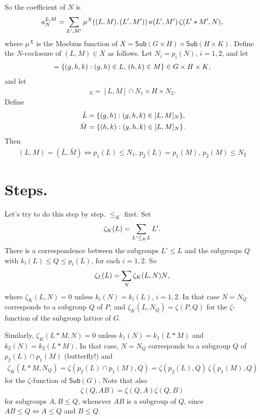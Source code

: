 \documentclass[12pt,a4paper]{amsart}
\newcommand{\Sub}{\mathsf{Sub}}
\begin{document}
So the coefficient of $N$ is
\begin{align*}
  a^{L,M}_N = \sum_{L',M'} \mu^X((L, M), (L', M'))\,  \kappa(L', M') \, \zeta(L' * M', N)\text,
\end{align*}
where $\mu^X$ is the Moebius function of $X = \Sub(G \times H) \times \Sub(H \times K)$.  Define the $N$-coclosure of $(L, M) \in X$ as follows.
Let $N_i = p_i(N)$, $i = 1,2$, and let
\begin{align*}
  [L, M] = \{(g, h, k) : (g, h) \in L,\, (h, k) \in M\} \in G \times H \times K\text,
\end{align*}
and let
\begin{align*}
  [L, M]_N = [L, M] \cap N_1 \times H \times N_2.
\end{align*}
Define
\begin{align*}
  \bar{L} &= \{(g,h) : (g,h,k) \in [L, M]_N\}\text,\\
  \bar{M} &= \{(h,k) : (g,h,k) \in [L, M]_N\}\text.
\end{align*}
Then
\begin{align*}
  (L, M) = (\bar{L}, \bar{M}) \iff
p_1(L) \leq N_1,\, p_2(L) = p_1(M),\, p_2(M) \leq N_2
\end{align*}

\section{Steps.}
\label{sec:steps}

Let's try to do this step by step.  $\leq_K$ first. Set
\begin{align*}
  \zeta_K(L) = \sum_{L' \leq_K L} L'\text.
\end{align*}
There is a correspondence between the subgroups $L' \leq L$ and
the subgroups $Q$ with $k_i(L) \leq Q \leq p_i(L)$, for each $i = 1,2$.
So
\begin{align*}
  \zeta_L(L) = \sum_N \zeta_K(L, N) N\text,
\end{align*}
where $\zeta_K(L, N) = 0$ unless $k_i(N) = k_i(L)$, $i = 1,2$.
In that case $N = N_Q$ corresponds to a subgroup $Q$
of $P$, and $\zeta_K(L, N_Q) = \zeta(P, Q)$ for the $\zeta$-function
of the subgroup lattice of $G$.

Similarly, $\zeta_K(L * M, N) = 0$ unless $k_1(N) = k_1(L * M)$
and $k_2(N) = k_2(L * M)$.  In that case, $N = N_Q$
corresponds to a subgroup $Q$ of $p_2(L) \cap p_1(M)$ (butterfly!)
and
\begin{align*}
  \zeta_K(L * M, N_Q)
  = \zeta(p_2(L) \cap p_1(M), Q)
  = \zeta(p_2(L), Q)\, \zeta(p_1(M), Q)
\end{align*}
for the $\zeta$-function of $\Sub(G)$.
Note that also
\begin{align*}
  \zeta(Q, AB) = \zeta(Q, A) \zeta(Q, B)
\end{align*}
for subgroups $A, B \leq Q$,
whenever $AB$ is a subgroup of $Q$,
since $AB \leq Q \iff A \leq Q$ and $B \leq Q$.
\end{document}
